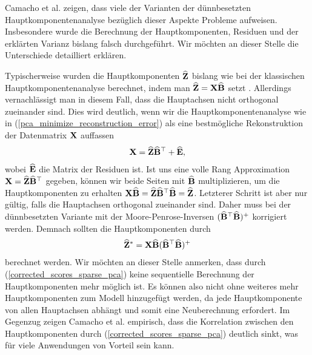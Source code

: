 Camacho et al. zeigen, dass viele der Varianten der dünnbesetzten Hauptkomponentenanalyse bezüglich dieser Aspekte Probleme aufweisen. Insbesondere wurde die Berechnung der Hauptkomponenten, Residuen und der erklärten Varianz bislang falsch durchgeführt. Wir möchten an dieser Stelle die Unterschiede detailliert erklären.

Typischerweise wurden die Hauptkomponenten $\widehat{\mathbf{Z}}$ bislang wie bei der klassischen Hauptkomponentenanalyse berechnet, indem man $\widehat{\mathbf{Z}} = \mathbf{X} \widehat{\mathbf{B}}$ setzt \cite{zou_sparsepca}. Allerdings vernachlässigt man in diesem Fall, dass die Hauptachsen nicht orthogonal zueinander sind. Dies wird deutlich, wenn wir die Hauptkomponentenanalyse wie in (\ref{pca_minimize_reconstruction_error}) als eine bestmögliche Rekonstruktion der Datenmatrix $\mathbf{X}$ auffassen
\begin{align}
\label{pca_scores_loadings_model}
\mathbf{X} = \widehat{\mathbf{Z}} \widehat{\mathbf{B}}^{\top} + \widehat{\mathbf{E}},
\end{align}
wobei $\widehat{\mathbf{E}}$ die Matrix der Residuen ist. Ist uns eine volle Rang Approximation $\mathbf{X} = \widehat{\mathbf{Z}} \widehat{\mathbf{B}}^{\top}$ gegeben, können wir beide Seiten mit $\widehat{\mathbf{B}}$ multiplizieren, um die Hauptkomponenten zu erhalten $\mathbf{X} \widehat{\mathbf{B}} = \widehat{\mathbf{Z}} \widehat{\mathbf{B}}^{\top} \widehat{\mathbf{B}} = \widehat{\mathbf{Z}}$. Letzterer Schritt ist aber nur gültig, falls die Hauptachsen orthogonal zueinander sind. Daher muss bei der dünnbesetzten Variante mit der Moore-Penrose-Inversen $(\widehat{\mathbf{B}}^{\top} \widehat{\mathbf{B}})^+$ korrigiert werden. Demnach sollten die Hauptkomponenten durch
\begin{align}
\label{corrected_scores_sparse_pca}
\widehat{\mathbf{Z}}^* = \mathbf{X} \widehat{\mathbf{B}} (\widehat{\mathbf{B}}^{\top} \widehat{\mathbf{B}})^+
\end{align}
berechnet werden. Wir möchten an dieser Stelle anmerken, dass durch (\ref{corrected_scores_sparse_pca}) keine sequentielle Berechnung der Hauptkomponenten mehr möglich ist. Es können also nicht ohne weiteres mehr Hauptkomponenten zum Modell hinzugefügt werden, da jede Hauptkomponente von allen Hauptachsen abhängt und somit eine Neuberechnung erfordert. Im Gegenzug zeigen Camacho et al. empirisch, dass die Korrelation zwischen den Hauptkomponenten durch (\ref{corrected_scores_sparse_pca}) deutlich sinkt, was für viele Anwendungen von Vorteil sein kann.

